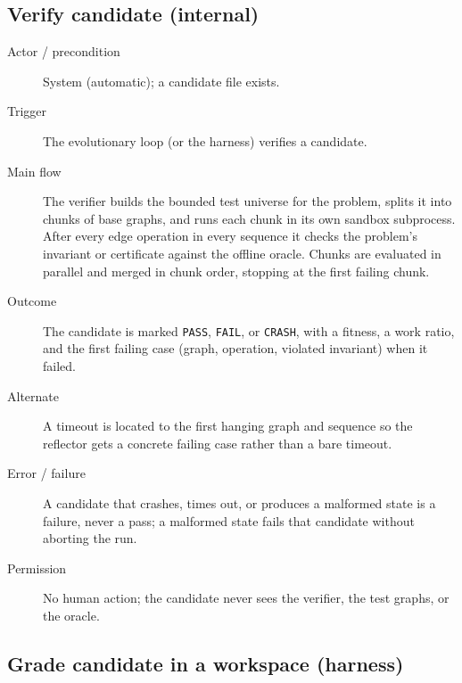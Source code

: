 \subsection{Verify candidate (internal)}

\begin{description}
  \item[Actor / precondition] System (automatic); a candidate file exists.
  \item[Trigger] The evolutionary loop (or the harness) verifies a candidate.
  \item[Main flow] The verifier builds the bounded test universe for the
  problem, splits it into chunks of base graphs, and runs each chunk in its own
  sandbox subprocess. After every edge operation in every sequence it checks
  the problem's invariant or certificate against the offline oracle. Chunks are
  evaluated in parallel and merged in chunk order, stopping at the first
  failing chunk.
  \item[Outcome] The candidate is marked \texttt{PASS}, \texttt{FAIL}, or
  \texttt{CRASH}, with a fitness, a work ratio, and the first failing case
  (graph, operation, violated invariant) when it failed.
  \item[Alternate] A timeout is located to the first hanging graph and sequence
  so the reflector gets a concrete failing case rather than a bare timeout.
  \item[Error / failure] A candidate that crashes, times out, or produces a
  malformed state is a failure, never a pass; a malformed state fails that
  candidate without aborting the run.
  \item[Permission] No human action; the candidate never sees the verifier,
  the test graphs, or the oracle.
\end{description}

\subsection{Grade candidate in a workspace (harness)}

